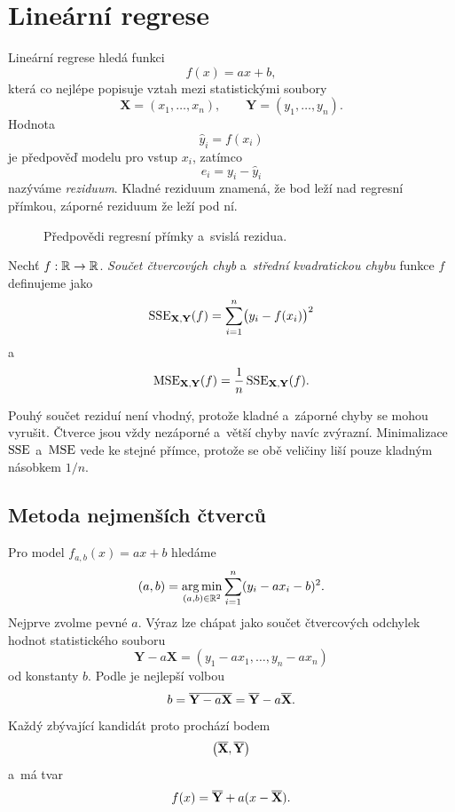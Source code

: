 \section{Lineární regrese}\label{sec:ai-linearni-regrese}

Lineární regrese hledá funkci
\[
    f(x)=ax+b,
\]
která co nejlépe popisuje vztah mezi statistickými soubory
\[
    \mathbf{X}=(x_1,\ldots,x_n),
    \qquad
    \mathbf{Y}=(y_1,\ldots,y_n).
\]
Hodnota
\[
    \hat y_i=f(x_i)
\]
je předpověď modelu pro vstup \(x_i\), zatímco
\[
    e_i=y_i-\hat y_i
\]
nazýváme \emph{reziduum}. Kladné reziduum znamená, že bod leží nad regresní přímkou, záporné reziduum že leží pod ní.

\begin{figure}[ht]
    \centering
    
    \caption{Předpovědi regresní přímky a~svislá rezidua.}
    \label{fig:ai-regrese-rezidua}
\end{figure}

\begin{definition}\label{def:ai-sse-mse}
    Nechť \(f:\mathbb{R} \rightarrow \mathbb{R}\). \emph{Součet čtvercových chyb} a~\emph{střední kvadratickou chybu} funkce \(f\) definujeme jako
    \[
        \operatorname{SSE}_{\mathbf{X},\mathbf{Y}}(f)
        =
        \sum_{i=1}^{n}
        \bigl(y_i-f(x_i)\bigr)^2
    \]
    a
    \[
        \operatorname{MSE}_{\mathbf{X},\mathbf{Y}}(f)
        =
        \frac1n
        \operatorname{SSE}_{\mathbf{X},\mathbf{Y}}(f).
    \]
\end{definition}

Pouhý součet reziduí není vhodný, protože kladné a~záporné chyby se mohou vyrušit. Čtverce jsou vždy nezáporné a~větší chyby navíc zvýrazní. Minimalizace \(\operatorname{SSE}\) a~\(\operatorname{MSE}\) vede ke stejné přímce, protože se obě veličiny liší pouze kladným násobkem \(1/n\).

\subsection{Metoda nejmenších čtverců}

Pro model \(f_{a,b}(x)=ax+b\) hledáme
\[
    (a,b)
    =
    \operatorname*{arg\,min}_{(a,b)\in\mathbb{R}^2}
    \sum_{i=1}^{n}(y_i-ax_i-b)^2.
\]
Nejprve zvolme pevné \(a\). Výraz lze chápat jako součet čtvercových odchylek hodnot statistického souboru
\[
    \mathbf{Y}-a\mathbf{X}
    =
    (y_1-ax_1,\ldots,y_n-ax_n)
\]
od konstanty \(b\). Podle
 je nejlepší volbou
\[
    b
    =
    \overline{\mathbf{Y}-a\mathbf{X}}
    =
    \overline{\mathbf{Y}}
    -
    a\overline{\mathbf{X}}.
\]
Každý zbývající kandidát proto prochází bodem
\[
    \bigl(\overline{\mathbf{X}},\overline{\mathbf{Y}}\bigr)
\]
a~má tvar
\[
    f(x)
    =
    \overline{\mathbf{Y}}
    +
    a(x-\overline{\mathbf{X}}).
\]

